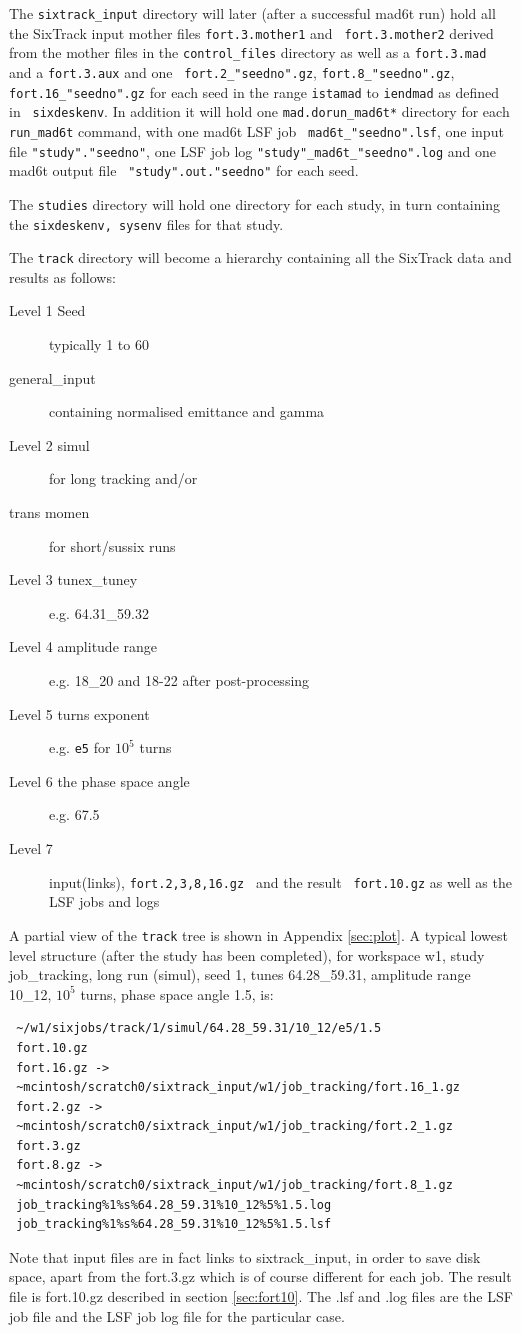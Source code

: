 \documentclass{cernatsnote}
\begin{document}
The {\tt sixtrack\_input} directory will later (after a successful mad6t run)
hold all the SixTrack input mother files {\tt fort.3.mother1} and {\tt
fort.3.mother2} derived from the mother files in the {\tt control\_files}
directory as well as a {\tt fort.3.mad} and a {\tt fort.3.aux} and one {\tt
fort.2\_"seedno".gz}, {\tt fort.8\_"seedno".gz}, {\tt fort.16\_"seedno".gz} for
each seed in the range {\tt istamad} to {\tt iendmad} as defined in {\tt
sixdeskenv}. In addition it will hold one {\tt mad.dorun\_mad6t*} directory for
each {\tt run\_mad6t} command, with one mad6t LSF job {\tt
mad6t\_"seedno".lsf}, one input file {\tt "study"."seedno"}, one LSF job log
{\tt "study"\_mad6t\_"seedno".log} and one mad6t output file {\tt
"study".out."seedno"} for each seed.

The {\tt studies} directory will hold one directory for each study, in turn
containing the {\tt sixdeskenv, sysenv} files for that study.

The {\tt track} directory will become a hierarchy containing all the SixTrack
data and results as follows:
\begin{description}
\item [Level 1 Seed] typically 1 to 60
\item [        general\_input] containing normalised emittance and gamma
\item [Level 2 simul] for long tracking and/or 
\item [        trans momen] for short/sussix runs
\item [Level 3 tunex\_tuney] e.g. 64.31\_59.32
\item [Level 4 amplitude range] e.g. 18\_20 and 18-22 after post-processing
\item [Level 5 turns exponent] e.g. {\tt e5} for $10^5$ turns
\item [Level 6 the phase space angle] e.g. 67.5  
\item [Level 7] input(links), {\tt fort.2,3,8,16.gz } and the result {\tt
  fort.10.gz} as well as the LSF jobs and logs
\end{description}
A partial view of the {\tt track} tree is shown in Appendix \ref{sec:plot}.  A
typical lowest level structure (after the study has been completed),
for workspace w1, study job\_tracking, long run (simul), seed 1, tunes
64.28\_59.31, amplitude range 10\_12, $10^5$ turns, phase space angle 1.5, is:
\begin{verbatim}
 ~/w1/sixjobs/track/1/simul/64.28_59.31/10_12/e5/1.5
 fort.10.gz
 fort.16.gz -> 
 ~mcintosh/scratch0/sixtrack_input/w1/job_tracking/fort.16_1.gz
 fort.2.gz -> 
 ~mcintosh/scratch0/sixtrack_input/w1/job_tracking/fort.2_1.gz
 fort.3.gz
 fort.8.gz -> 
 ~mcintosh/scratch0/sixtrack_input/w1/job_tracking/fort.8_1.gz
 job_tracking%1%s%64.28_59.31%10_12%5%1.5.log
 job_tracking%1%s%64.28_59.31%10_12%5%1.5.lsf
\end{verbatim}
Note that input files are in fact links to sixtrack\_input, in order to save
disk space, apart from the fort.3.gz which is of course different for each job.
The result file is fort.10.gz described in section \ref{sec:fort10}. The .lsf
and .log files are the LSF job file and the LSF job log file for the particular
case.
\end{document}
